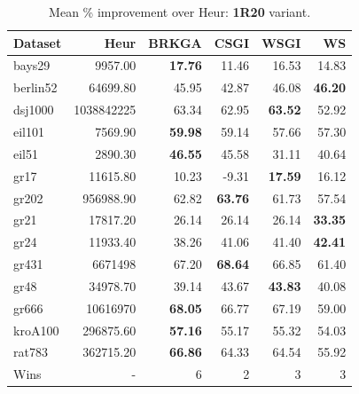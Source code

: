 \documentclass[sigconf]{acmart}
\begin{document}
\begin{table}[t]
\centering
\caption{Mean \% improvement over Heur: \textbf{1R20} variant.}
\label{tab:1r20}
\small
\begin{tabular}{lrrrrr}
\toprule
Dataset & Heur & BRKGA & CSGI & WSGI & WS \\
\midrule
bays29 & 9957.00 & \textbf{17.76} & 11.46 & 16.53 & 14.83 \\
berlin52 & 64699.80 & 45.95 & 42.87 & 46.08 & \textbf{46.20} \\
dsj1000 & 1038842225 & 63.34 & 62.95 & \textbf{63.52} & 52.92 \\
eil101 & 7569.90 & \textbf{59.98} & 59.14 & 57.66 & 57.30 \\
eil51 & 2890.30 & \textbf{46.55} & 45.58 & 31.11 & 40.64 \\
gr17 & 11615.80 & 10.23 & -9.31 & \textbf{17.59} & 16.12 \\
gr202 & 956988.90 & 62.82 & \textbf{63.76} & 61.73 & 57.54 \\
gr21 & 17817.20 & 26.14 & 26.14 & 26.14 & \textbf{33.35} \\
gr24 & 11933.40 & 38.26 & 41.06 & 41.40 & \textbf{42.41} \\
gr431 & 6671498 & 67.20 & \textbf{68.64} & 66.85 & 61.40 \\
gr48 & 34978.70 & 39.14 & 43.67 & \textbf{43.83} & 40.08 \\
gr666 & 10616970 & \textbf{68.05} & 66.77 & 67.19 & 59.00 \\
kroA100 & 296875.60 & \textbf{57.16} & 55.17 & 55.32 & 54.03 \\
rat783 & 362715.20 & \textbf{66.86} & 64.33 & 64.54 & 55.92 \\
\midrule
Wins & - & 6 & 2 & 3 & 3 \\
\bottomrule
\end{tabular}
\end{table}
\end{document}
